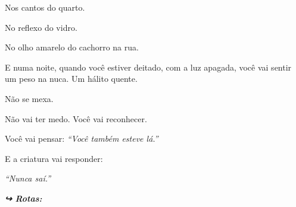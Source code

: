 \noindent Nos cantos do quarto.

\noindent No reflexo do vidro.

\noindent No olho amarelo do cachorro na rua.

\noindent E numa noite, quando você estiver deitado, com a luz apagada, você vai sentir um peso na nuca. Um hálito quente.

\noindent Não se mexa.

\noindent Não vai ter medo. Você vai reconhecer.

\noindent Você vai pensar: \textit{\textquotedblleft{}Você também esteve lá.\textquotedblright{}}

\noindent E a criatura vai responder:

\noindent \textit{\textquotedblleft{}Nunca saí.\textquotedblright{}}

\vspace{0.5em}
\noindent\textit{\textbf{↪ Rotas:}  \rotasep {}}
